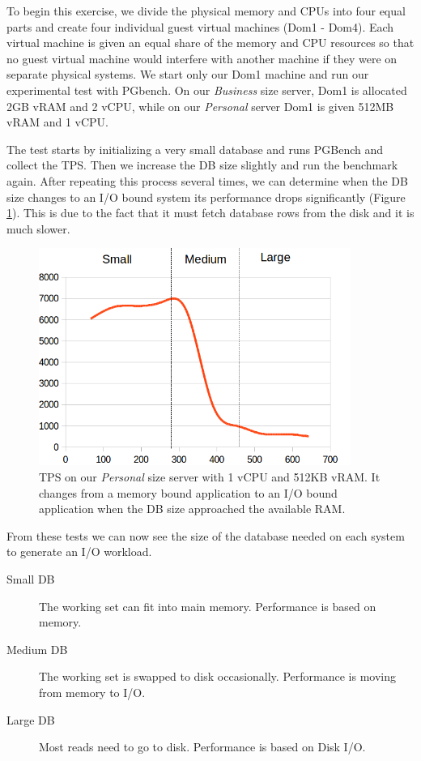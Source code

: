 To begin this exercise, we divide the physical memory and CPUs into four equal parts and create four individual guest virtual machines (Dom1 - Dom4).  
Each virtual machine is given an equal share of the memory and CPU resources so that no guest virtual machine would interfere with another machine if they were on separate physical systems.  
We start only our Dom1 machine and run our experimental test with PGbench.  
On our \emph{Business} size server, Dom1 is allocated 2GB vRAM and 2 vCPU, while on our \emph{Personal} server Dom1 is given 512MB vRAM and 1 vCPU.  

The test starts by initializing a very small database and runs PGBench and collect the TPS.  
Then we increase the DB size slightly and run the benchmark again.  
After repeating this process several times, we can determine when the DB size changes to an I/O bound system its performance drops significantly (Figure \ref{smallIO}).  
This is due to the fact that it must fetch database rows from the disk and it is much slower.  

\begin{figure}[!h]
  \begin{center}
  \includegraphics[width=4in]{images/SmallScale.png}
  \caption{TPS on our \emph{Personal} size server with 1 vCPU and 512KB vRAM. It changes from a memory bound application to an I/O bound application when the DB size approached the available RAM.}
  \label{smallIO}
  \end{center}
\end{figure}

From these tests we can now see the size of the database needed on each system to generate an I/O workload. 
\begin{description}
  \item[Small DB] The working set can fit into main memory.  Performance is based on memory.
  \item[Medium DB] The working set is swapped to disk occasionally. Performance is moving from memory to I/O.
  \item[Large DB] Most reads need to go to disk.  Performance is based on Disk I/O.
\end{description}

